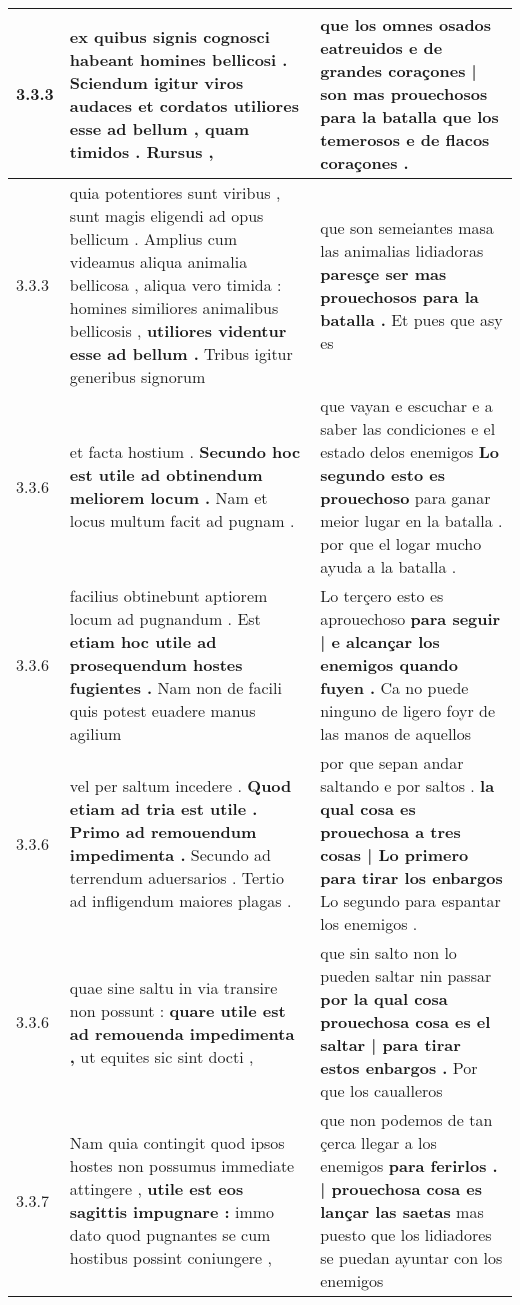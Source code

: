 \begin{tabular}{|p{1cm}|p{6.5cm}|p{6.5cm}|}
3.3.3 & ex quibus signis cognosci habeant homines bellicosi . \textbf{ Sciendum igitur viros audaces et cordatos utiliores esse ad bellum , } quam timidos . Rursus , & que los omnes osados eatreuidos \textbf{ e de grandes coraçones | son mas prouechosos para la batalla } que los temerosos e de flacos coraçones . \\\hline
3.3.3 & quia potentiores sunt viribus , sunt magis eligendi ad opus bellicum . Amplius cum videamus aliqua animalia bellicosa , aliqua vero timida : homines similiores animalibus bellicosis , \textbf{ utiliores videntur esse ad bellum . } Tribus igitur generibus signorum & que son semeiantes masa las animalias lidiadoras \textbf{ paresçe ser mas prouechosos para la batalla . } Et pues que asy es \\\hline
3.3.6 & et facta hostium . \textbf{ Secundo hoc est utile ad obtinendum meliorem locum . } Nam et locus multum facit ad pugnam . & que vayan e escuchar e a saber las condiciones e el estado delos enemigos \textbf{ Lo segundo esto es prouechoso } para ganar meior lugar en la batalla . por que el logar mucho ayuda a la batalla . \\\hline
3.3.6 & facilius obtinebunt aptiorem locum ad pugnandum . Est \textbf{ etiam hoc utile ad prosequendum hostes fugientes . } Nam non de facili quis potest euadere manus agilium & Lo terçero esto es aprouechoso \textbf{ para seguir | e alcançar los enemigos quando fuyen . } Ca no puede ninguno de ligero foyr de las manos de aquellos \\\hline
3.3.6 & vel per saltum incedere . \textbf{ Quod etiam ad tria est utile . Primo ad remouendum impedimenta . } Secundo ad terrendum aduersarios . Tertio ad infligendum maiores plagas . & por que sepan andar saltando e por saltos . \textbf{ la qual cosa es prouechosa a tres cosas | Lo primero para tirar los enbargos } Lo segundo para espantar los enemigos . \\\hline
3.3.6 & quae sine saltu in via transire non possunt : \textbf{ quare utile est ad remouenda impedimenta , } ut equites sic sint docti , & que sin salto non lo pueden saltar nin passar \textbf{ por la qual cosa prouechosa cosa es el saltar | para tirar estos enbargos . } Por que los caualleros \\\hline
3.3.7 & Nam quia contingit quod ipsos hostes non possumus immediate attingere , \textbf{ utile est eos sagittis impugnare : } immo dato quod pugnantes se cum hostibus possint coniungere , & que non podemos de tan çerca llegar a los enemigos \textbf{ para ferirlos . | prouechosa cosa es lançar las saetas } mas puesto que los lidiadores se puedan ayuntar con los enemigos \\\hline

\end{tabular}
